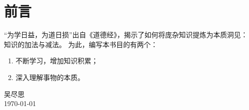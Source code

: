 \documentclass[../main.tex]{subfiles}
\begin{document}
\section*{前言}

``为学日益，为道日损''出自《道德经》，揭示了如何将庞杂知识提炼为本质洞见：知识的加法与减法。
为此，编写本书目的有两个：
\begin{enumerate}[itemsep=0pt, parsep=0pt, topsep=0pt, partopsep=0pt]
  \item 不断学习，增加知识积累；
  \item 深入理解事物的本质。
\end{enumerate}

\begin{flushright}
  吴尽思 \\ \today
\end{flushright}
\end{document}
